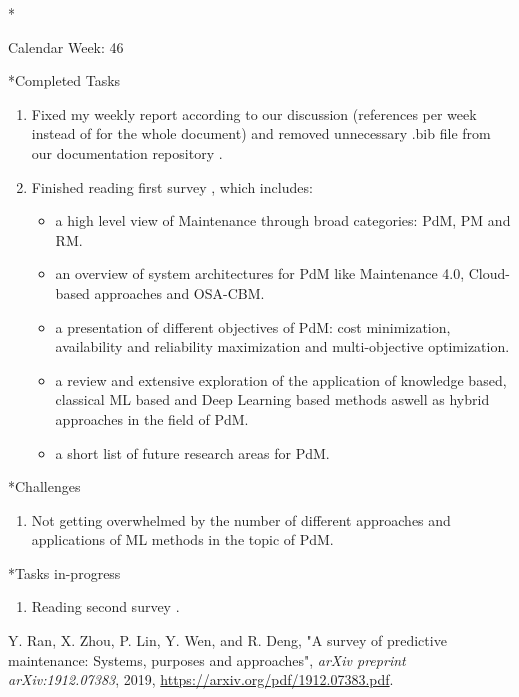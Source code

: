 \documentclass[11pt,a4paper]{article}
\begin{document}
\begin{section}*{Calendar Week: 46 \hfill \date{13 November, 2020}}
	
	\begin{subsection}*{Completed Tasks}
		\begin{enumerate}
			\item
			Fixed my weekly report according to our discussion (references per week instead of for the whole document) and removed unnecessary .bib file from our documentation repository \cite{documentation-repository}.
			\item
			Finished reading first survey \cite{survey1}, which includes:
			\begin{itemize}
				\item a high level view of Maintenance through broad categories: PdM, PM and RM.
				\item an overview of system architectures for PdM like Maintenance 4.0, Cloud-based approaches and OSA-CBM.
				\item a presentation of different objectives of PdM: cost minimization, availability and reliability maximization and multi-objective optimization.
				\item a review and extensive exploration of the application of knowledge based, classical ML based and Deep Learning based methods aswell as hybrid approaches in the field of PdM.
				\item a short list of future research areas for PdM.
			\end{itemize}
		\end{enumerate}
	\end{subsection}
	
	\begin{subsection}*{Challenges}
		\begin{enumerate}
			\item
			Not getting overwhelmed by the number of different approaches and applications of ML methods in the topic of PdM.
		\end{enumerate}
	\end{subsection}
	
	\begin{subsection}*{Tasks in-progress}
		\begin{enumerate}
			\item
			Reading second survey \cite{survey2}.
		\end{enumerate}
	\end{subsection}
	
	\begin{thebibliography}{9}
		{Y. Ran, X. Zhou, P. Lin, Y. Wen, and R. Deng},
		"A survey of predictive maintenance: Systems, purposes and approaches",
		\textit{arXiv preprint arXiv:1912.07383},
		2019,
		\href{https://arxiv.org/pdf/1912.07383.pdf}{https://arxiv.org/pdf/1912.07383.pdf}.
		

\end{thebibliography}
\end{section}
\end{document}
